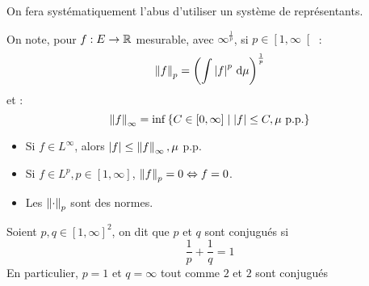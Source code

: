 \documentclass{cours}
\begin{document}
        On fera systématiquement l'abus d'utiliser un système de représentants. 

        \begin{definition}
            On note, pour $f : E \rightarrow \mathbb{R}$ mesurable, avec $\infty^{\frac{1}{p}}$, si $p \in \left[1, \infty\right[$ :
            \[
                \left\lVert f \right\rVert_{p} = \left(\int \left|f\right|^{p}{\rm \, d} \mu\right)^{\frac{1}{p}}    
            \]
            et :
            \[
                \left\lVert f \right\rVert_{\infty} = \inf \left\{C \in \left[0, \infty\right] \mid \left|f\right| \leq C, \mu \text{ p.p.}\right\}
            \]
        \end{definition}

        \begin{proposition}
            \begin{itemize}
                \item Si $f \in L^{\infty}$, alors $\left|f\right| \leq \left\lVert f \right\rVert_{\infty}, \mu$ p.p.
                \item Si $f \in L^{p}, p \in \left[1, \infty\right]$, $\left\lVert f \right\rVert_{p} = 0 \Leftrightarrow f = 0$.
                \item Les $\left\lVert \cdot \right\rVert_{p}$ sont des normes.
            \end{itemize}
        \end{proposition}

        \begin{definition}
            Soient $p, q \in \left[1, \infty\right]^{2}$, on dit que $p$ et $q$ sont conjugués si 
            \[
                \frac{1}{p} + \frac{1}{q} = 1    
            \]
            En particulier, $p = 1$ et $q = \infty$ tout comme $2$ et $2$ sont conjugués
        \end{definition}
\end{document}
